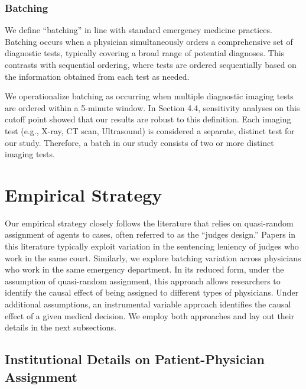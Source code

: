 \documentclass[,,nonblindrev]{informs}
\begin{document}
\hypertarget{batching}{%
\subsubsection{Batching}\label{batching}}

We define ``batching'' in line with standard emergency medicine
practices. Batching occurs when a physician simultaneously orders a
comprehensive set of diagnostic tests, typically covering a broad range
of potential diagnoses. This contrasts with sequential ordering, where
tests are ordered sequentially based on the information obtained from
each test as needed.

We operationalize batching as occurring when multiple diagnostic imaging
tests are ordered within a 5-minute window. In Section 4.4, sensitivity
analyses on this cutoff point showed that our results are robust to this
definition. Each imaging test (e.g., X-ray, CT scan, Ultrasound) is
considered a separate, distinct test for our study. Therefore, a batch
in our study consists of two or more distinct imaging tests.

\hypertarget{sec:3}{%
\section{Empirical Strategy}\label{sec:3}}

Our empirical strategy closely follows the literature that relies on
quasi-random assignment of agents to cases, often referred to as the
``judges design.'' Papers in this literature typically exploit variation
in the sentencing leniency of judges who work in the same court.
Similarly, we explore batching variation across physicians who work in
the same emergency department. In its reduced form, under the assumption
of quasi-random assignment, this approach allows researchers to identify
the causal effect of being assigned to different types of physicians.
Under additional assumptions, an instrumental variable approach
identifies the causal effect of a given medical decision. We employ both
approaches and lay out their details in the next subsections.

\hypertarget{institutional-details-on-patient-physician-assignment}{%
\subsection{Institutional Details on Patient-Physician
Assignment}\label{institutional-details-on-patient-physician-assignment}}
\end{document}
